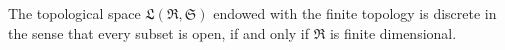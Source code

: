 The topological space $\mathfrak{L}(\mathfrak{R}, \mathfrak{S})$ endowed with the finite topology is discrete in the sense that every subset is open, if and only if $\mathfrak{R}$ is finite dimensional.
